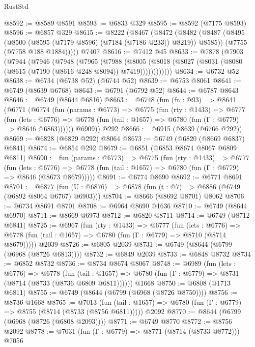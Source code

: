 \begin{lexlean}{RustStd}
\begin{coremodule}
@8592 := @8589 @8591
@8593 := @6833 @329
@8595 := @8592 (@7175 @8593)
@8596 := @6857 @329
@8615 := @8222
    (@8467
      (@8472
        (@8482
          (@8487 (@8495 (@8500 (@8595 (@7179 @8596) (@7184 (@7186 @233)) @8219)) @8585))
          (@7755 (@7758 @188 @1884)))))
    @7407
@8616 := @7412 @45
@8633 := @7878
    (@7903
      (@7944
        (@7946
          (@7948
            (@7965
              (@7988
                (@8005
                  (@8018 (@8027 (@8031 (@8080 (@8615 (@7190 (@8616 @248 @8094)) @7419))))))))))))
@8634 := @6732 @52
@8638 := @6734 (@6738 @52) (@6744 @52)
@8639 := @6753 @8061
@8641 := @6749 (@8639 @6768)
@8643 := @6791 (@6792 @52)
@8644 := @6787 @8643
@8646 := @6749 (@8644 @6816)
@8663 := @6748
    (fun (fn : @93) =>
    @8641
      (@6771
        (@6774
          (fun (params : @6773) =>
          @6775
            (fun (rty : @1433) =>
            @6777
              (fun (lets : @6776) =>
              @6778 (fun (tail : @1657) => @6780 (fun (Γ : @6779) => @8646 @6863))))))
        @6909))
    @292
@8666 := @6915 (@8639 (@6766 @292))
@8669 := @6828 (@6829 @292) @8064
@8673 := @6749 (@6820 (@8669 @6837) @6841)
@8674 := @6854 @292
@8679 := @6851 (@6853 @8674 @8067 @6809 @6811)
@8690 := fun (params : @6773) =>
  @6775
    (fun (rty : @1433) =>
    @6777
      (fun (lets : @6776) =>
      @6778 (fun (tail : @1657) => @6780 (fun (Γ : @6779) => @8646 (@8673 @8679)))))
@8691 := @6774 @8690
@8692 := @6771 @8691
@8701 := @6877 (fun (U : @6876) => @6878 (fun (t : @7) => @6886 (@6749 (@6892 @8064 @6767) @6903)))
@8704 := @8666 (@8692 @8701) @8062
@8706 := @6734 @8691 @8701
@8708 := @6964 @8690 @1636
@8710 := @6749 (@8644 @6970)
@8711 := @8669 @6973
@8712 := @6820 @8711
@8714 := @6749 (@8712 @6841)
@8725 := @6967
    (fun (rty : @1433) =>
    @6777
      (fun (lets : @6776) =>
      @6778 (fun (tail : @1657) => @6780 (fun (Γ : @6779) => @8710 (@8714 @8679)))))
    @2039
@8726 := @6805 @2039
@8731 := @6749 (@8644 (@6799 (@6968 (@8726 @6813))))
@8732 := @6849 @2039
@8733 := @6848 @8732
@8734 := @6852 @8732
@8736 := @8734 @8674 @8067
@8748 := @6989
    (fun (lets : @6776) =>
    @6778
      (fun (tail : @1657) => @6780 (fun (Γ : @6779) => @8731 (@8714 (@8733 (@8736 @6809 @6811))))))
    @1668
@8750 := @6808 (@1713 @6811)
@8755 := @6749 (@8644 (@6799 (@6968 (@8726 @8750))))
@8756 := @8736 @1668
@8765 := @7013
    (fun (tail : @1657) => @6780 (fun (Γ : @6779) => @8755 (@8714 (@8733 (@8756 @6811)))))
    @2092
@8770 := @8644 (@6799 (@6968 (@8726 (@6808 @2093))))
@8771 := @6749 @8770
@8772 := @8756 @2092
@8778 := @7031 (fun (Γ : @6779) => @8771 (@8714 (@8733 @8772))) @7056

\end{coremodule}
\end{lexlean}
